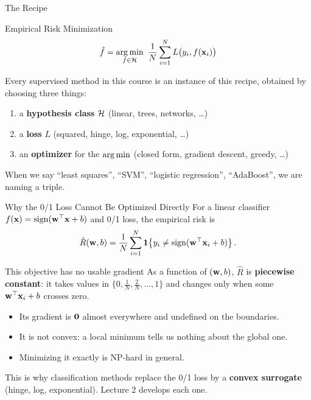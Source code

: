 \documentclass[11pt,aspectratio=169]{beamer}
\begin{document}
\begin{frame}{The Recipe}
\begin{block}{Empirical Risk Minimization}
\[
\hat f=\operatorname*{arg\,min}_{f\in\mathcal{H}}\ \frac1N\sum_{i=1}^N L\bigl(y_i,f(\mathbf{x}_i)\bigr)
\]
\end{block}
Every supervised method in this course is an instance of this recipe, obtained by choosing three things:
\begin{enumerate}
  \item a \textbf{hypothesis class} $\mathcal{H}$ \hfill (linear, trees, networks, \dots)
  \item a \textbf{loss} $L$ \hfill (squared, hinge, log, exponential, \dots)
  \item an \textbf{optimizer} for the $\operatorname*{arg\,min}$ \hfill (closed form, gradient descent, greedy, \dots)
\end{enumerate}
\vspace{6pt}
When we say ``least squares'', ``SVM'', ``logistic regression'', ``AdaBoost'', we are naming a triple.
\end{frame}

\begin{frame}{Why the 0/1 Loss Cannot Be Optimized Directly}
For a linear classifier $f(\mathbf{x})=\operatorname{sign}(\mathbf{w}^{\top}\mathbf{x}+b)$ and 0/1 loss, the empirical risk is
\[
\hat R(\mathbf{w},b)=\frac1N\sum_{i=1}^N\mathbf{1}\!\left\{y_i\neq\operatorname{sign}(\mathbf{w}^{\top}\mathbf{x}_i+b)\right\}.
\]
\begin{claim}{This objective has no usable gradient}
As a function of $(\mathbf{w},b)$, $\hat R$ is \textbf{piecewise constant}: it takes values in
$\{0,\tfrac1N,\tfrac2N,\dots,1\}$ and changes only when some $\mathbf{w}^{\top}\mathbf{x}_i+b$ crosses zero.
\begin{itemize}
  \item Its gradient is $\mathbf{0}$ almost everywhere and undefined on the boundaries.
  \item It is not convex: a local minimum tells us nothing about the global one.
  \item Minimizing it exactly is NP-hard in general.
\end{itemize}
\end{claim}
\begin{keypoint}
This is why classification methods replace the 0/1 loss by a \textbf{convex surrogate} (hinge, log,
exponential). Lecture 2 develops each one.
\end{keypoint}
\end{frame}

\end{document}
